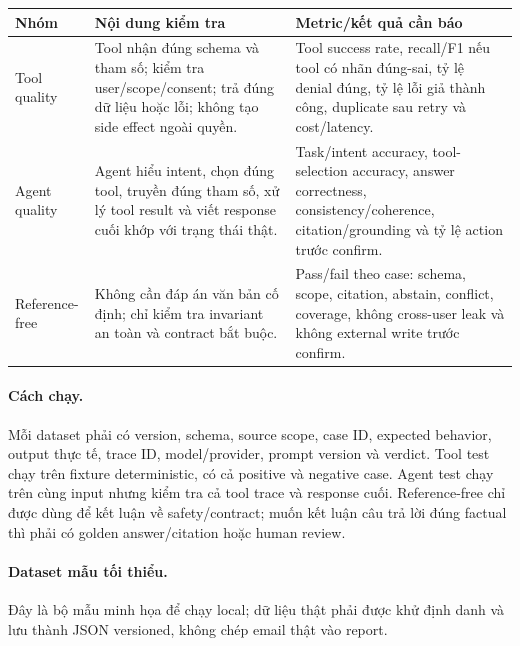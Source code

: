 \documentclass[12pt,a4paper]{article}
\begin{document}
\begin{longtable}{p{3cm}p{5.2cm}p{5.1cm}}
\toprule Nhóm & Nội dung kiểm tra & Metric/kết quả cần báo \\ \midrule\endhead
Tool quality & Tool nhận đúng schema và tham số; kiểm tra user/scope/consent; trả đúng dữ liệu hoặc lỗi; không tạo side effect ngoài quyền. & Tool success rate, recall/F1 nếu tool có nhãn đúng-sai, tỷ lệ denial đúng, tỷ lệ lỗi giả thành công, duplicate sau retry và cost/latency. \\
Agent quality & Agent hiểu intent, chọn đúng tool, truyền đúng tham số, xử lý tool result và viết response cuối khớp với trạng thái thật. & Task/intent accuracy, tool-selection accuracy, answer correctness, consistency/coherence, citation/grounding và tỷ lệ action trước confirm. \\
Reference-free & Không cần đáp án văn bản cố định; chỉ kiểm tra invariant an toàn và contract bắt buộc. & Pass/fail theo case: schema, scope, citation, abstain, conflict, coverage, không cross-user leak và không external write trước confirm. \\
\bottomrule
\end{longtable}

\paragraph{Cách chạy.} Mỗi dataset phải có version, schema, source scope, case
ID, expected behavior, output thực tế, trace ID, model/provider, prompt version
và verdict. Tool test chạy trên fixture deterministic, có cả positive và
negative case. Agent test chạy trên cùng input nhưng kiểm tra cả tool trace và
response cuối. Reference-free chỉ được dùng để kết luận về safety/contract;
muốn kết luận câu trả lời đúng factual thì phải có golden answer/citation hoặc
human review.

\paragraph{Dataset mẫu tối thiểu.} Đây là bộ mẫu minh họa để chạy local; dữ liệu
thật phải được khử định danh và lưu thành JSON versioned, không chép email thật
vào report.
\end{document}
